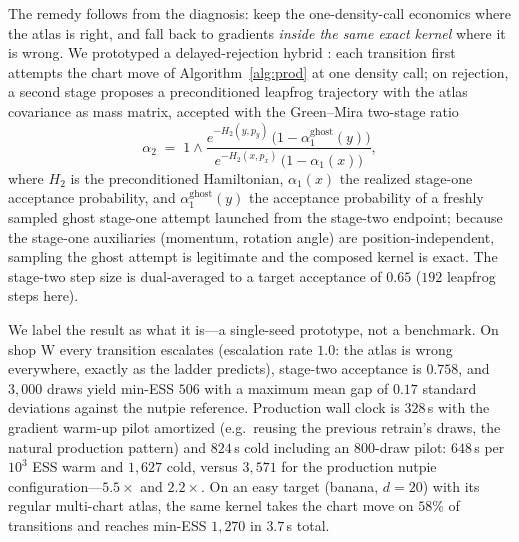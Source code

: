 \documentclass[11pt]{article}
\theoremstyle{remark}
\begin{document}
The remedy follows from the diagnosis: keep the one-density-call
economics where the atlas is right, and fall back to gradients
\emph{inside the same exact kernel} where it is wrong. We prototyped
a delayed-rejection hybrid \citep{green2001,modi2023}: each
transition first attempts the chart move of Algorithm~\ref{alg:prod}
at one density call; on rejection, a second stage proposes a
preconditioned leapfrog trajectory with the atlas covariance as mass
matrix, accepted with the Green--Mira two-stage ratio
\begin{equation}
\alpha_2
\;=\;1\wedge
\frac{e^{-H_2(y,p_y)}\,\bigl(1-\alpha_1^{\mathrm{ghost}}(y)\bigr)}
     {e^{-H_2(x,p_x)}\,\bigl(1-\alpha_1(x)\bigr)},
\label{eq:dr}
\end{equation}
where $H_2$ is the preconditioned Hamiltonian, $\alpha_1(x)$ the
realized stage-one acceptance probability, and
$\alpha_1^{\mathrm{ghost}}(y)$ the acceptance probability of a
freshly sampled ghost stage-one attempt launched from the stage-two
endpoint; because the stage-one auxiliaries (momentum, rotation
angle) are position-independent, sampling the ghost attempt is
legitimate and the composed kernel is exact. The stage-two step size
is dual-averaged to a target acceptance of $0.65$ ($192$ leapfrog
steps here).

We label the result as what it is---a single-seed prototype, not a
benchmark. On shop W every transition escalates (escalation rate
$1.0$: the atlas is wrong everywhere, exactly as the ladder
predicts), stage-two acceptance is $0.758$, and $3{,}000$ draws yield
min-ESS $506$ with a maximum mean gap of $0.17$ standard deviations
against the nutpie reference. Production wall clock is $328$\,s with
the gradient warm-up pilot amortized (e.g.\ reusing the previous
retrain's draws, the natural production pattern) and $824$\,s cold
including an $800$-draw pilot: $648$\,s per $10^3$ ESS warm and
$1{,}627$ cold, versus $3{,}571$ for the production nutpie
configuration---$5.5\times$ and $2.2\times$. On an easy target
(banana, $d{=}20$) with its regular multi-chart atlas, the same
kernel takes the chart move on $58\%$ of transitions and reaches
min-ESS $1{,}270$ in $3.7$\,s total.
\end{document}
